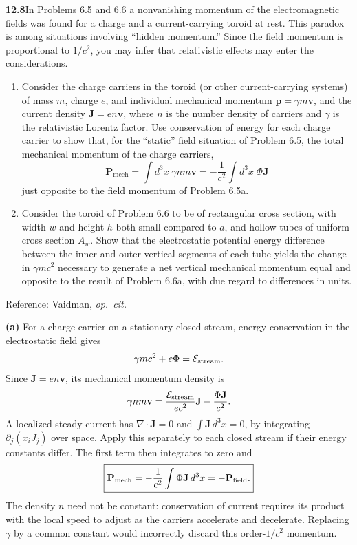 \par\bigskip
\noindent\textbf{12.8}\quad In Problems 6.5 and 6.6 a nonvanishing momentum of the electromagnetic fields was found for a charge and a current-carrying toroid at rest. This paradox is among situations involving ``hidden momentum.'' Since the field momentum is proportional to $1/c^{2}$, you may infer that relativistic effects may enter the considerations.
\begin{enumerate}
\item[(a)] Consider the charge carriers in the toroid (or other current-carrying systems) of mass $m$, charge $e$, and individual mechanical momentum $\mathbf{p}=\gamma m\mathbf{v}$, and the current density $\mathbf{J}=en\mathbf{v}$, where $n$ is the number density of carriers and $\gamma$ is the relativistic Lorentz factor. Use conservation of energy for each charge carrier to show that, for the ``static'' field situation of Problem 6.5, the total mechanical momentum of the charge carriers,
\[
\mathbf{P}_{\mathrm{mech}}=\int d^{3}x\;\gamma nm\mathbf{v}=-\frac{1}{c^{2}}\int d^{3}x\;\Phi\mathbf{J}
\]
just opposite to the field momentum of Problem 6.5a.
\item[(b)] Consider the toroid of Problem 6.6 to be of rectangular cross section, with width $w$ and height $h$ both small compared to $a$, and hollow tubes of uniform cross section $A_{w}$. Show that the electrostatic potential energy difference between the inner and outer vertical segments of each tube yields the change in $\gamma mc^{2}$ necessary to generate a net vertical mechanical momentum equal and opposite to the result of Problem 6.6a, with due regard to differences in units.
\end{enumerate}
Reference: Vaidman, \emph{op.\ cit.}
\solution

\medskip\noindent\textbf{(a)} For a charge carrier on a stationary closed stream, energy
conservation in the electrostatic field gives
\[
\gamma mc^2+e\Phi=\mathcal E_{\rm stream}.
\]
Since $\mathbf J=en\mathbf v$, its mechanical momentum density is
\[
\gamma nm\mathbf v
=\frac{\mathcal E_{\rm stream}}{ec^2}\mathbf J
-\frac{\Phi\mathbf J}{c^2}.
\]
A localized steady current has $\nabla\cdot\mathbf J=0$ and
$\int\mathbf J\,d^3x=0$, by integrating
$\partial_j(x_iJ_j)$ over space.  Apply this separately to each
closed stream if their energy constants differ.  The first term
then integrates to zero and
\[
\boxed{\mathbf P_{\rm mech}=-\frac1{c^2}
 \int\Phi\mathbf J\,d^3x=-\mathbf P_{\rm field}.}
\]
The density $n$ need not be constant: conservation of current
requires its product with the local speed to adjust as the carriers
accelerate and decelerate.  Replacing $\gamma$ by a common constant
would incorrectly discard this order-$1/c^2$ momentum.

